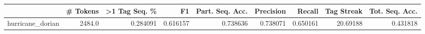 \begin{tabular}{lrrrrrrrr}
\toprule
{} &  \# Tokens &  >1 Tag Seq. \% &        F1 &  Part. Seq. Acc. &  Precision &    Recall &  Tag Streak &  Tot. Seq. Acc. \\
\midrule
hurricane\_dorian &    2484.0 &       0.284091 &  0.616157 &         0.738636 &   0.738071 &  0.650161 &    20.69188 &        0.431818 \\
\bottomrule
\end{tabular}
